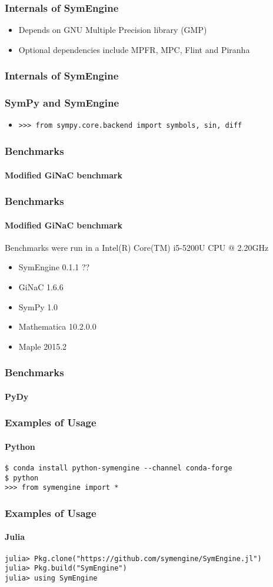\documentclass{beamer}
\begin{document}
\begin{frame}
\frametitle{Internals of SymEngine}
\begin{itemize}
\item Depends on GNU Multiple Precision library (GMP)
\item Optional dependencies include MPFR, MPC, Flint and Piranha
\end{itemize}
\end{frame}


\begin{frame}
\frametitle{Internals of SymEngine}
\end{frame}



\begin{frame}[fragile]
\frametitle{SymPy and SymEngine}
\begin{itemize}
\item
\begin{verbatim}
>>> from sympy.core.backend import symbols, sin, diff
\end{verbatim}
\end{itemize}
\end{frame}


\begin{frame}
\frametitle{Benchmarks}
\framesubtitle{Modified GiNaC benchmark}
\end{frame}


\begin{frame}
\frametitle{Benchmarks}
\framesubtitle{Modified GiNaC benchmark}
Benchmarks were run in a Intel(R) Core(TM) i5-5200U CPU @ 2.20GHz
\begin{itemize}
 \item SymEngine 0.1.1 ??
 \item GiNaC 1.6.6
 \item SymPy 1.0
 \item Mathematica 10.2.0.0
 \item Maple 2015.2
\end{itemize}
\end{frame}


\begin{frame}
\frametitle{Benchmarks}
\framesubtitle{PyDy}
\end{frame}


\begin{frame}[fragile]
\frametitle{Examples of Usage}
\framesubtitle{Python}

\begin{verbatim}
$ conda install python-symengine --channel conda-forge
$ python
>>> from symengine import *
\end{verbatim}
\end{frame}


\begin{frame}[fragile]
\frametitle{Examples of Usage}
\framesubtitle{Julia}

\begin{verbatim}
julia> Pkg.clone("https://github.com/symengine/SymEngine.jl")
julia> Pkg.build("SymEngine")
julia> using SymEngine
\end{verbatim}
\end{frame}
\end{document}
